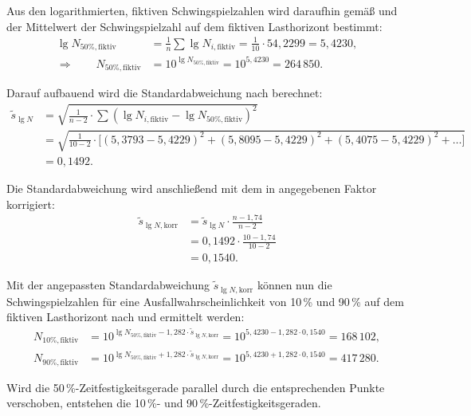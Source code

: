 Aus den logarithmierten, fiktiven Schwingspielzahlen wird daraufhin gemäß  und  der Mittelwert der Schwingspielzahl auf dem fiktiven Lasthorizont bestimmt: 
\begin{align*}
\lg N_{50\%,\mathrm{fiktiv}}
&= \frac{1}{n} \sum \lg N_{i,\mathrm{fiktiv}}
= \frac{1}{10} \cdot 54{,}2299
= 5{,}4230, \\[1ex]
\Rightarrow \qquad
N_{50\%,\mathrm{fiktiv}}
&= 10^{\lg N_{50\%,\mathrm{fiktiv}}}
= 10^{5{,}4230}= 264\,850.
\end{align*}

Darauf aufbauend wird die Standardabweichung nach  berechnet:
\begin{align*}
\tilde{s}_{\lg N}
&=
\sqrt{
\frac{1}{n-2}
\cdot
\sum
\left(
\lg N_{i,\mathrm{fiktiv}}
-
\lg N_{50\%,\mathrm{fiktiv}}
\right)^2
} \\[1ex]
&=
\sqrt{
\frac{1}{10-2}
\cdot
\Big[
(5{,}3793-5{,}4229)^2
+
(5{,}8095-5{,}4229)^2
+
(5{,}4075-5{,}4229)^2
+\ldots
\Big]
} \\[1ex]
&= 0{,}1492.
\end{align*}

\clearpage

Die Standardabweichung wird anschließend mit dem in  angegebenen Faktor korrigiert:
 \begin{align*}
\tilde{s}_{\lg N,\mathrm{korr}}
&=\tilde{s}_{\lg N}\cdot\frac{n-1{,}74}{n-2} \\
&=0{,}1492\cdot\frac{10-1{,}74}{10-2} \\
&=0{,}1540.
\end{align*}

Mit der angepassten Standardabweichung $\tilde{s}_{\lg N,\mathrm{korr}}$ können nun die Schwingspielzahlen für eine Ausfallwahrscheinlichkeit von 10\,\% und 90\,\% auf dem fiktiven Lasthorizont nach  und  ermittelt werden:
\begin{align*}
N_{10\%,\mathrm{fiktiv}}
&= 10^{\lg N_{50\%,\mathrm{fiktiv}}
-1{,}282\cdot\tilde{s}_{\lg N,\mathrm{korr}}}
= 10^{5{,}4230-1{,}282\cdot0{,}1540}= 168\,102, \\[1ex]
N_{90\%,\mathrm{fiktiv}}
&= 10^{\lg N_{50\%,\mathrm{fiktiv}}
+1{,}282\cdot\tilde{s}_{\lg N,\mathrm{korr}}}
= 10^{5{,}4230+1{,}282\cdot0{,}1540}= 417\,280.
\end{align*}

 Wird die 50\,\%-Zeitfestigkeitsgerade parallel durch die entsprechenden Punkte verschoben, entstehen die 10\,\%- und 90\,\%-Zeitfestigkeitsgeraden.

